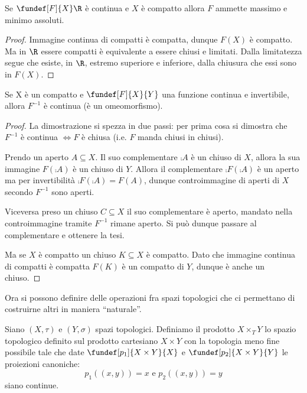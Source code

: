 \begin{lemma}
Se $\fundef[F]{X}\R$ è continua e $X$ è compatto allora $F$ ammette massimo e minimo assoluti.
\end{lemma}
\begin{proof}
Immagine continua di compatti è compatta, dunque $F(X)$ è compatto. Ma in $\R$ essere compatti è equivalente a essere chiusi e limitati. Dalla limitatezza segue che esiste, in $\R$, estremo superiore e inferiore, dalla chiusura che essi sono in $F(X)$.
\end{proof}

\begin{lemma}
Se X è un compatto e  $\fundef[F]{X}{Y}$ una funzione continua e invertibile, allora $F^{-1}$ è continua (è un omeomorfismo).
\end{lemma}
\begin{proof}
La dimostrazione si spezza in due passi: 
per prima cosa si dimostra che $F^{-1}$ è continua $\iff F$ è chiusa (i.e. $F$ manda chiusi in chiusi).

Prendo un aperto $A\subseteq X$. Il suo complementare $\comp A$ è un chiuso di $X$, allora la sua immagine $F(\comp A)$ è un chiuso di $Y$. Allora il complementare  $\comp{F(\comp A)}$ è un aperto ma per invertibilità $\comp{F(\comp A)}=F(A)$, dunque controimmagine di aperti di $X$ secondo $F^{-1}$ sono aperti.

Viceversa preso un chiuso $C \subseteq X$ il suo complementare è aperto, mandato nella controimmagine tramite $F^{-1}$ rimane aperto. Si può dunque passare al complementare e ottenere la tesi.

Ma se $X$ è compatto un chiuso $K\subseteq X$ è compatto. Dato che immagine continua di compatti è compatta $F(K)$ è un compatto di $Y$, dunque è anche un chiuso.  
\end{proof}

Ora si possono definire delle operazioni fra spazi topologici che ci permettano di costruirne altri in maniera ``naturale''.

\begin{defn}
Siano $(X,\tau)$ e $(Y, \sigma)$ spazi topologici. Definiamo il prodotto $X\times_T Y$ lo spazio topologico definito sul prodotto cartesiano $X\times Y$ con la topologia meno fine possibile tale che date $\fundef[p_1]{X\times Y}{X}$ e $\fundef[p_2]{X\times Y}{Y}$ le proiezioni canoniche:
\begin{equation}
 p_1((x, y))=x \text{  e  } p_2((x, y))=y
\end{equation} 
siano continue.
\end{defn}

